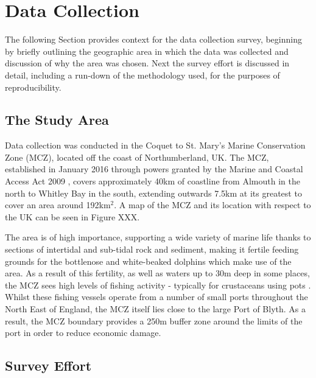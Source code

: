 \section{Data Collection}\label{ch:NDD,sec:dataCollection}

The following Section provides context for the data collection survey, beginning by briefly outlining the geographic area in which the data was collected and discussion of why the area was chosen. Next the survey effort is discussed in detail, including a run-down of the methodology used, for the purposes of reproducibility. 

\subsection{The Study Area}\label{ch:NDD,sec:dataCollection,sub:studyArea}

Data collection was conducted in the Coquet to St. Mary's Marine Conservation Zone (MCZ), located off the coast of Northumberland, UK. The MCZ, established in January 2016 through powers granted by the Marine and Coastal Access Act 2009 \cite{noauthor_marine_2009}, covers approximately 40km of coastline from Almouth in the north to Whitley Bay in the south, extending outwards 7.5km at its greatest to cover an area around 192km$^{2}$. A map of the MCZ and its location with respect to the UK can be seen in Figure XXX.

The area is of high importance, supporting a wide variety of marine life thanks to sections of intertidal and sub-tidal rock and sediment, making it fertile feeding grounds for the bottlenose and white-beaked dolphins which make use of the area. As a result of this fertility, as well as waters up to 30m deep in some places, the MCZ sees high levels of fishing activity - typically for crustaceans using pots \cite{stephenson_spatial_2017}. Whilst these fishing vessels operate from a number of small ports throughout the North East of England, the MCZ itself lies close to the large Port of Blyth. As a result, the MCZ boundary provides a 250m buffer zone around the limits of the port in order to reduce economic damage. 


\subsection{Survey Effort}\label{ch:NDD,sec:dataCollection,sub:surveyArea}

